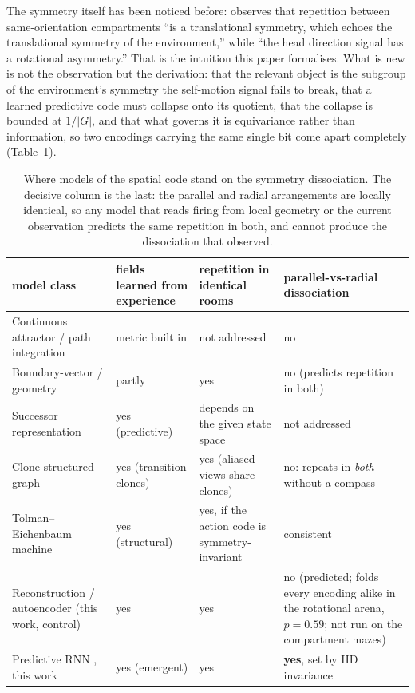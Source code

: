 \documentclass[9pt,lineno]{elife}
\begin{document}
The symmetry itself has been noticed before: \citet{jeffery2023} observes that repetition between
same-orientation compartments ``is a translational symmetry, which echoes the translational symmetry of
the environment,'' while ``the head direction signal has a rotational asymmetry.'' That is the intuition
this paper formalises. What is new is not the observation but the derivation: that the relevant object
is the subgroup of the environment's symmetry the self-motion signal fails to break, that a learned
predictive code must collapse onto its quotient, that the collapse is bounded at $1/|G|$, and that what
governs it is equivariance rather than information, so two encodings carrying the same single bit come
apart completely (Table~\ref{tab:models}).

\begin{table}[t]
\centering
\small
\setlength{\tabcolsep}{4pt}
\caption{Where models of the spatial code stand on the symmetry dissociation. The decisive column
is the last: the parallel and radial arrangements are locally identical, so any model that reads
firing from local geometry or the current observation predicts the same repetition in both, and
cannot produce the dissociation that \citet{grieves2016} observed.}
\label{tab:models}
\begin{tabular}{p{}p{}p{}p{}}
\toprule
model class & fields learned from experience & repetition in identical rooms &
parallel-vs-radial dissociation \\
\midrule
Continuous attractor / path integration \citep{burak2009, sorscher2023unified}
& metric built in & not addressed & no \\[3pt]
Boundary-vector / geometry \citep{hartley2000}
& partly & yes & no (predicts repetition in both) \\[3pt]
Successor representation \citep{stachenfeld2017}
& yes (predictive) & depends on the given state space & not addressed \\[3pt]
Clone-structured graph \citep{george2021,raju2024}
& yes (transition clones) & yes (aliased views share clones) & no: repeats in \emph{both}
without a compass \citep{raju2024} \\[3pt]
Tolman--Eichenbaum machine \citep{whittington2020tolman}
& yes (structural) & yes, if the action code is symmetry-invariant & consistent \\[3pt]
Reconstruction / autoencoder (this work, control)
& yes & yes & no (predicted; folds every encoding alike in the rotational arena, $p=0.59$;
not run on the compartment mazes) \\[3pt]
Predictive RNN \citep{levenstein2024}, this work
& yes (emergent) & yes & \textbf{yes}, set by HD invariance \\
\bottomrule
\end{tabular}
\end{table}
\end{document}
